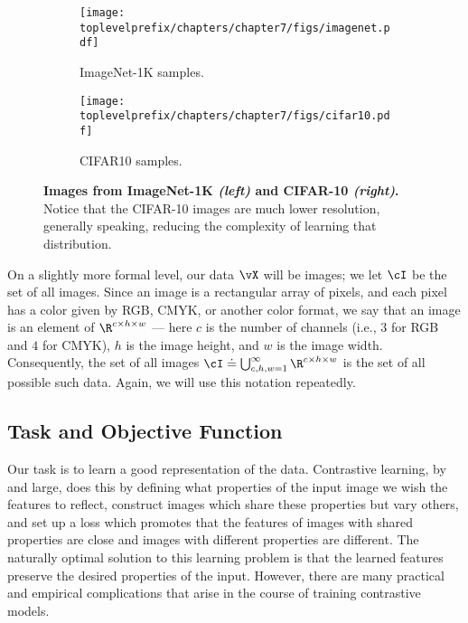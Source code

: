 \documentclass[../../book-main.tex]{subfiles}
\begin{document}
\begin{figure}
    \centering
    
    \hfill 
    \begin{subfigure}{0.3\textwidth}
        \centering 
        \texttt{[image: \\toplevelprefix/chapters/chapter7/figs/imagenet.pdf]}
        \caption{\small ImageNet-1K samples.}
    \end{subfigure}
    \hfill 
    \begin{subfigure}{0.26\textwidth}
        \centering 
        \texttt{[image: \\toplevelprefix/chapters/chapter7/figs/cifar10.pdf]}
        \caption{\small CIFAR10 samples.}
    \end{subfigure}
    \hfill 
    \phantom{}

    \caption{\small\textbf{Images from ImageNet-1K \textit{(left)} and CIFAR-10 \textit{(right)}.} Notice that the CIFAR-10 images are much lower resolution, generally speaking, reducing the complexity of learning that distribution.}
    \label{fig:in1k_cifar10_examples}
\end{figure}

On a slightly more formal level, our data \(\vX\) will be images; we let \(\cI\) be the set of all images. Since an image is a rectangular array of pixels, and each pixel has a color given by RGB, CMYK, or another color format, we say that an image is an element of \(\R^{c \times h \times w}\) --- here \(c\) is the number of channels (i.e., \(3\) for RGB and \(4\) for CMYK), \(h\) is the image height, and \(w\) is the image width. Consequently, the set of all images \(\cI \doteq \bigcup_{c, h, w = 1}^{\infty}\R^{c \times h \times w}\) is the set of all possible such data. Again, we will use this notation repeatedly.


\subsection{Task and Objective Function} \label{sub:contrastive_learning_objective}

Our task is to learn a good representation of the data. Contrastive learning, by and large, does this by defining what properties of the input image we wish the features to reflect, construct images which share these properties but vary others, and set up a loss which promotes that the features of images with shared properties are close and images with different properties are different. The naturally optimal solution to this learning problem is that the learned features preserve the desired properties of the input. However, there are many practical and empirical complications that arise in the course of training contrastive models.
\end{document}
